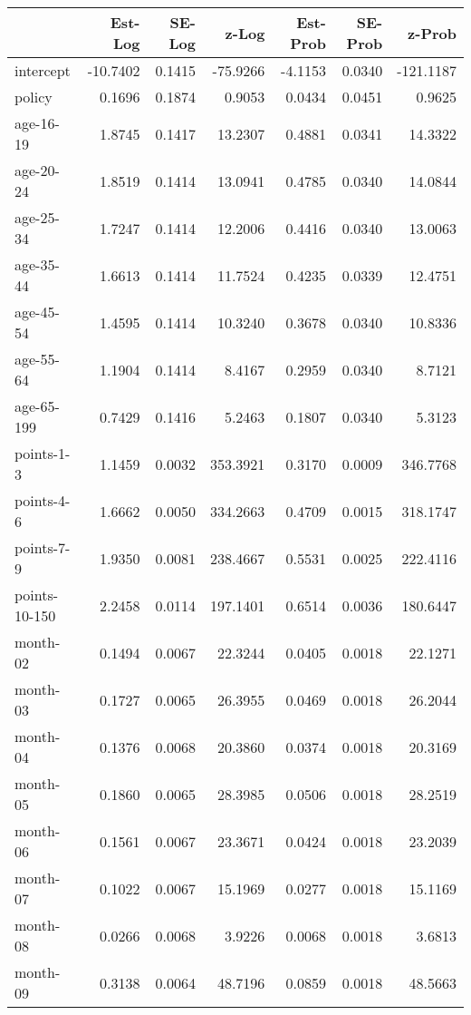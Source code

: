 \documentclass[10pt]{article}
\begin{document}
\begin{table}[ht]
\centering
\begin{tabular}{lrrrrrr}
  \hline
 & Est-Log & SE-Log & z-Log & Est-Prob & SE-Prob & z-Prob \\ 
  \hline
intercept & -10.7402 & 0.1415 & -75.9266 & -4.1153 & 0.0340 & -121.1187 \\ 
  policy & 0.1696 & 0.1874 & 0.9053 & 0.0434 & 0.0451 & 0.9625 \\ 
  age-16-19 & 1.8745 & 0.1417 & 13.2307 & 0.4881 & 0.0341 & 14.3322 \\ 
  age-20-24 & 1.8519 & 0.1414 & 13.0941 & 0.4785 & 0.0340 & 14.0844 \\ 
  age-25-34 & 1.7247 & 0.1414 & 12.2006 & 0.4416 & 0.0340 & 13.0063 \\ 
  age-35-44 & 1.6613 & 0.1414 & 11.7524 & 0.4235 & 0.0339 & 12.4751 \\ 
  age-45-54 & 1.4595 & 0.1414 & 10.3240 & 0.3678 & 0.0340 & 10.8336 \\ 
  age-55-64 & 1.1904 & 0.1414 & 8.4167 & 0.2959 & 0.0340 & 8.7121 \\ 
  age-65-199 & 0.7429 & 0.1416 & 5.2463 & 0.1807 & 0.0340 & 5.3123 \\ 
  points-1-3 & 1.1459 & 0.0032 & 353.3921 & 0.3170 & 0.0009 & 346.7768 \\ 
  points-4-6 & 1.6662 & 0.0050 & 334.2663 & 0.4709 & 0.0015 & 318.1747 \\ 
  points-7-9 & 1.9350 & 0.0081 & 238.4667 & 0.5531 & 0.0025 & 222.4116 \\ 
  points-10-150 & 2.2458 & 0.0114 & 197.1401 & 0.6514 & 0.0036 & 180.6447 \\ 
  month-02 & 0.1494 & 0.0067 & 22.3244 & 0.0405 & 0.0018 & 22.1271 \\ 
  month-03 & 0.1727 & 0.0065 & 26.3955 & 0.0469 & 0.0018 & 26.2044 \\ 
  month-04 & 0.1376 & 0.0068 & 20.3860 & 0.0374 & 0.0018 & 20.3169 \\ 
  month-05 & 0.1860 & 0.0065 & 28.3985 & 0.0506 & 0.0018 & 28.2519 \\ 
  month-06 & 0.1561 & 0.0067 & 23.3671 & 0.0424 & 0.0018 & 23.2039 \\ 
  month-07 & 0.1022 & 0.0067 & 15.1969 & 0.0277 & 0.0018 & 15.1169 \\ 
  month-08 & 0.0266 & 0.0068 & 3.9226 & 0.0068 & 0.0018 & 3.6813 \\ 
  month-09 & 0.3138 & 0.0064 & 48.7196 & 0.0859 & 0.0018 & 48.5663 \\ 

\end{tabular}
\end{table}
\end{document}
